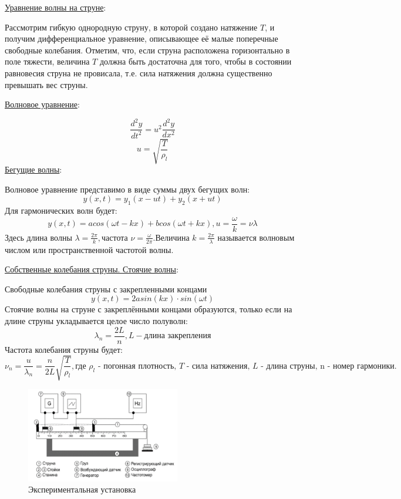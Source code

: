 \documentclass[a4paper]{article}
\begin{document}
\underline{Уравнение волны на струне}:\par

Рассмотрим гибкую однородную струну, в которой создано натяжение $T$, и получим дифференциальное уравнение, описывающее её малые поперечные свободные колебания. Отметим, что, если струна расположена горизонтально в поле тяжести, величина $T$ должна быть достаточна для того, чтобы в состоянии равновесия струна не провисала, т.е. сила натяжения должна существенно превышать вес струны.

\underline{Волновое уравнение}:\par

\[\frac{d^2y}{dt^2} = u^2\frac{d^2y}{dx^2}\]
\[u = \sqrt{\frac{T}{\rho_{l}}}\]
\underline{Бегущие волны}:\par

Волновое уравнение представимо в виде суммы двух бегущих волн:
\[y(x,t) = y_{1}(x - ut) + y_{2}(x + ut)\]
Для гармонических волн будет:
\[y(x,t) = a cos(\omega t - kx) + b cos(\omega t + kx), u = \frac{\omega}{k} = \nu \lambda\]
Здесь длина волны $\lambda = \frac{2\pi}{k}, \text{частота } \nu = \frac{\omega}{2\pi} . \text{Величина } k = \frac{2\pi}{\lambda}$ называется волновым числом или пространственной частотой волны.

\underline{Собственные колебания струны. Стоячие волны}:\par

Свободные колебания струны с закрепленными концами
\[y(x,t) = 2a sin(kx) \cdot sin(\omega t)\]
Стоячие волны на струне с закреплёнными концами образуются, только если на длине струны укладывается целое число полуволн:
\[\lambda_{n} = \frac{2L}{n}, L - \text{длина закрепления}\]
Частота колебания струны будет:
\[\nu_{n} = \frac{u}{\lambda_{n}} = \frac{n}{2L}\sqrt{\frac{T}{\rho_{l}}},\text{где $\rho_{l}$ - погонная плотность, $T$ - сила натяжения, $L$ - длина струны, n - номер гармоники.}\]

\begin{figure}[t]
    \centering
    \includegraphics[width=0.6\textwidth]{pick1.png}
    \caption{Экспериментальная установка}
\end{figure}
\end{document}

